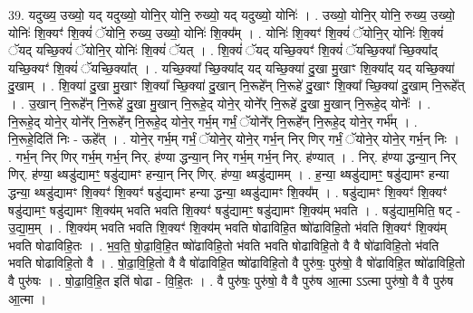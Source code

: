 \documentclass[17pt]{extarticle}
\begin{document}
39. यदुख्य॒ उख्यो॒ यद् यदुख्यो॒ योनि॒र् योनि॒ रुख्यो॒ यद् यदुख्यो॒ योनिः॑ । . उख्यो॒ योनि॒र् योनि॒ रुख्य॒ उख्यो॒ योनिः॑ शि॒क्यꣳ॑ शि॒क्यं॑ ॅयोनि॒ रुख्य॒ उख्यो॒ योनिः॑ शि॒क्य᳚म् । . योनिः॑ शि॒क्यꣳ॑ शि॒क्यं॑ ॅयोनि॒र् योनिः॑ शि॒क्यं॑ ॅयद् यच्छि॒क्यं॑ ॅयोनि॒र् योनिः॑ शि॒क्यं॑ ॅयत् । . शि॒क्यं॑ ॅयद् यच्छि॒क्यꣳ॑ शि॒क्यं॑ ॅयच्छि॒क्या᳚ च्छि॒क्या᳚द् यच्छि॒क्यꣳ॑ शि॒क्यं॑ ॅयच्छि॒क्या᳚त् । . यच्छि॒क्या᳚ च्छि॒क्या᳚द् यद् यच्छि॒क्या॑ दु॒खा मु॒खाꣳ शि॒क्या᳚द् यद् यच्छि॒क्या॑ दु॒खाम् । . शि॒क्या॑ दु॒खा मु॒खाꣳ शि॒क्या᳚ च्छि॒क्या॑ दु॒खान् नि॒रूहे᳚न् नि॒रूहे॑ दु॒खाꣳ शि॒क्या᳚ च्छि॒क्या॑ दु॒खाम् नि॒रूहे᳚त् । . उ॒खान् नि॒रूहे᳚न् नि॒रूहे॑ दु॒खा मु॒खान् नि॒रूहे॒द् योने॒र् योने᳚र् नि॒रूहे॑ दु॒खा मु॒खान् नि॒रूहे॒द् योनेः᳚ । . नि॒रूहे॒द् योने॒र् योने᳚र् नि॒रूहे᳚न् नि॒रूहे॒द् योने॒र् गर्भ॒म् गर्भं॒ ॅयोने᳚र् नि॒रूहे᳚न् नि॒रूहे॒द् योने॒र् गर्भ᳚म् । . नि॒रूहे॒दिति॑ निः - ऊहे᳚त् । . योने॒र् गर्भ॒म् गर्भं॒ ॅयोने॒र् योने॒र् गर्भ॒न् निर् णिर् गर्भं॒ ॅयोने॒र् योने॒र् गर्भ॒न् निः । . गर्भ॒न् निर् णिर् गर्भ॒म् गर्भ॒न् निर्. ह॑ण्या द्धन्या॒न् निर् गर्भ॒म् गर्भ॒न् निर्. ह॑ण्यात् । . निर्. ह॑ण्या द्धन्या॒न् निर् णिर्. ह॑ण्या॒ थ्षडु॑द्यामꣳ॒॒ षडु॑द्यामꣳ हन्या॒न् निर् णिर्. ह॑ण्या॒ थ्षडु॑द्यामम् । . ह॒न्या॒ थ्षडु॑द्यामꣳ॒॒ षडु॑द्यामꣳ हन्या द्धन्या॒ थ्षडु॑द्यामꣳ शि॒क्यꣳ॑ शि॒क्यꣳ॑ षडु॑द्यामꣳ हन्या द्धन्या॒ थ्षडु॑द्यामꣳ शि॒क्य᳚म् । . षडु॑द्यामꣳ शि॒क्यꣳ॑ शि॒क्यꣳ॑ षडु॑द्यामꣳ॒॒ षडु॑द्यामꣳ शि॒क्य॑म् भवति भवति शि॒क्यꣳ॑ षडु॑द्यामꣳ॒॒ षडु॑द्यामꣳ शि॒क्य॑म् भवति । . षडु॑द्याम॒मिति॒ षट् - उ॒द्या॒म॒म् । . शि॒क्य॑म् भवति भवति शि॒क्यꣳ॑ शि॒क्य॑म् भवति षोढाविहि॒त ष्षो॑ढाविहि॒तो भ॑वति शि॒क्यꣳ॑ शि॒क्य॑म् भवति षोढाविहि॒तः । . भ॒व॒ति॒ षो॒ढा॒वि॒हि॒त ष्षो॑ढाविहि॒तो भ॑वति भवति षोढाविहि॒तो वै वै षो॑ढाविहि॒तो भ॑वति भवति षोढाविहि॒तो वै । . षो॒ढा॒वि॒हि॒तो वै वै षो॑ढाविहि॒त ष्षो॑ढाविहि॒तो वै पुरु॑षः॒ पुरु॑षो॒ वै षो॑ढाविहि॒त ष्षो॑ढाविहि॒तो वै पुरु॑षः । . षो॒ढा॒वि॒हि॒त इति॑ षोढा - वि॒हि॒तः । . वै पुरु॑षः॒ पुरु॑षो॒ वै वै पुरु॑ष आ॒त्मा ऽऽत्मा पुरु॑षो॒ वै वै पुरु॑ष आ॒त्मा । \newline
\pagebreak
{}
\end{document}
